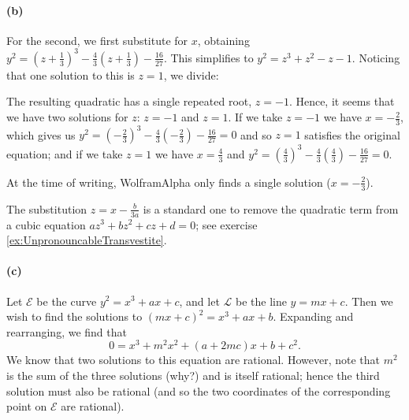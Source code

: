 \documentclass[a4paper,10pt]{article}
\begin{document}
\begin{center}\end{center}

\paragraph{(b)}
For the second, we first substitute for $ x $, obtaining $ y^2 = (z + \frac{1}{3})^3 - \frac{4}{3}(z + \frac{1}{3}) - \frac{16}{27} $. This
simplifies to $ y^2 = z^3 + z^2 - z - 1 $. Noticing that one solution to this is $ z = 1 $, we divide:


The resulting quadratic has a single repeated root, $ z = -1 $. Hence, it seems that
we have two solutions for $ z $: $ z = -1 $ and $ z = 1 $. If we take $ z = -1 $ we have $ x = -\frac{2}{3} $,
which gives us $ y^2 = \left(-\frac{2}{3}\right)^3 - \frac{4}{3} \left(-\frac{2}{3}\right) - \frac{16}{27} = 0 $
and so $ z = 1 $ satisfies the original equation; and if we take $ z = 1 $ we have $ x = \frac{4}{3} $ and
$ y^2 = \left(\frac{4}{3}\right)^3 - \frac{4}{3} \left(\frac{4}{3}\right) - \frac{16}{27} = 0 $.

At the time of writing, WolframAlpha only finds a single solution ($ x = -\frac{2}{3}$).

The substitution $ z = x - \frac{b}{3a} $ is a standard one to remove the quadratic term from
a cubic equation $ az^3 + bz^2 + cz + d = 0 $; see exercise \ref{ex:UnpronouncableTransvestite}.

\paragraph{(c)}
Let $ \mathcal{E} $ be the curve $ y^2 = x^3 + ax + c $, and let $ \mathcal{L} $ be the line $ y = mx + c $. Then we wish to
find the solutions to $ (mx + c)^2 = x^3 + ax + b $. Expanding and rearranging, we find that
\begin{displaymath}
  0 = x^3 + m^2 x^2 + (a + 2mc)x + b + c^2.
\end{displaymath}
We know that two solutions to this equation are rational. However, note that $ m^2 $ is the sum of the
three solutions (why?) and is itself rational; hence the third solution must also be rational (and so the two
coordinates of the corresponding point on $ \mathcal{E} $ are rational).
\end{document}
